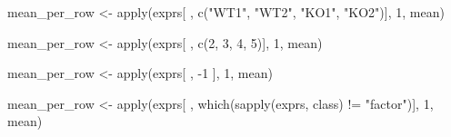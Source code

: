 \documentclass[
]{book}
\newenvironment{Shaded}{\begin{snugshade}}{\end{snugshade}}
\newcommand{\DecValTok}[1]{\textcolor[rgb]{0.00,0.00,0.81}{#1}}
\newcommand{\FunctionTok}[1]{\textcolor[rgb]{0.00,0.00,0.00}{#1}}
\newcommand{\NormalTok}[1]{#1}
\newcommand{\OtherTok}[1]{\textcolor[rgb]{0.56,0.35,0.01}{#1}}
\newcommand{\SpecialCharTok}[1]{\textcolor[rgb]{0.00,0.00,0.00}{#1}}
\newcommand{\StringTok}[1]{\textcolor[rgb]{0.31,0.60,0.02}{#1}}
\begin{document}
\begin{Shaded}
\begin{Highlighting}[]
\NormalTok{mean\_per\_row }\OtherTok{\textless{}{-}} \FunctionTok{apply}\NormalTok{(exprs[ , }\FunctionTok{c}\NormalTok{(}\StringTok{"WT1"}\NormalTok{, }\StringTok{"WT2"}\NormalTok{, }\StringTok{"KO1"}\NormalTok{, }\StringTok{"KO2"}\NormalTok{)], }\DecValTok{1}\NormalTok{, mean)}

\NormalTok{mean\_per\_row }\OtherTok{\textless{}{-}} \FunctionTok{apply}\NormalTok{(exprs[ , }\FunctionTok{c}\NormalTok{(}\DecValTok{2}\NormalTok{, }\DecValTok{3}\NormalTok{, }\DecValTok{4}\NormalTok{, }\DecValTok{5}\NormalTok{)], }\DecValTok{1}\NormalTok{, mean)}
  
\NormalTok{mean\_per\_row }\OtherTok{\textless{}{-}} \FunctionTok{apply}\NormalTok{(exprs[ , }\SpecialCharTok{{-}}\DecValTok{1}\NormalTok{ ], }\DecValTok{1}\NormalTok{, mean)}

\NormalTok{mean\_per\_row }\OtherTok{\textless{}{-}} \FunctionTok{apply}\NormalTok{(exprs[ , }\FunctionTok{which}\NormalTok{(}\FunctionTok{sapply}\NormalTok{(exprs, class) }\SpecialCharTok{!=} \StringTok{"factor"}\NormalTok{)], }\DecValTok{1}\NormalTok{, mean)}
\end{Highlighting}
\end{Shaded}
\end{document}
